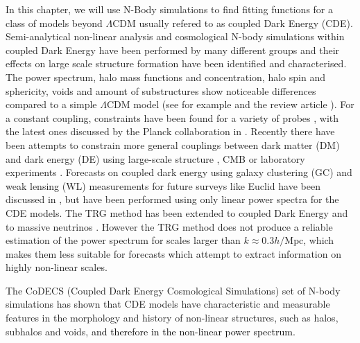 In this chapter, we will use N-Body simulations to find fitting functions
for a class of models beyond $\Lambda$CDM usually refered to as coupled
Dark Energy (CDE).
Semi-analytical non-linear
analysis \cite{wintergerst_clarifying_2010,Saracco_etal_2010} and
cosmological N-body simulations within coupled Dark Energy have been
performed by many different groups \citep{baldi_etal_2010,Li_Barrow_2011,maccio_coupled_2004,carlesi_hydrodynamical_2014-1,baldi_codecs_2012,2015arXiv150407243P}
and their effects on large scale structure formation have been identified
and characterised. The power spectrum, halo mass functions and concentration,
halo spin and sphericity, voids and amount of substructures show noticeable
differences compared to a simple $\Lambda$CDM model (see for example
\citep{mainini_mass_2006,maccio_concentration_2008,baldi_clarifying_2011,cui_halo_2012,baldi_effect_2011,sutter_observability_2014}
and the review article \citep{Baldi_2012b}). For a constant coupling,
constraints have been found for a variety of probes \citep{pettorino_constraints_2012,pettorino_testing_2013,amendola_skewness_2004,Xia_2009},
with the latest ones discussed by the Planck collaboration in \citep{planckcollaboration_planck2015_2015}.
Recently there have been attempts to constrain more general couplings
between dark matter (DM) and dark energy (DE) using large-scale structure
\citep{creminelli_single-field_2014}, CMB \citep{morris_cosmicmicrowave_2014}
or laboratory experiments \citep{hamilton_atominterferometry_2015}.
Forecasts on coupled dark energy using galaxy clustering (GC) and
weak lensing (WL) measurements for future surveys like Euclid have
been discussed in \citep{amendola2012testing}, but have been performed
using only linear power spectra for the CDE models. The TRG method
has been extended to coupled Dark Energy \citep{saracco_non-linear_2010}
and to massive neutrinos \citep{lesgourgues_non-linear_2009}. However
the TRG method does not produce a reliable estimation of the power
spectrum for scales larger than $k\approx0.3h/\mbox{Mpc}$, which
makes them less suitable for forecasts which attempt to extract information
on highly non-linear scales.

The CoDECS (Coupled Dark Energy Cosmological Simulations) set of N-body
simulations \citep{baldi_codecs_2012} has shown that CDE models have
characteristic and measurable features in the morphology and history
of non-linear structures, such as halos, subhalos and voids,\textcolor{black}{{}
and therefore in the non-linear power spectrum.}

